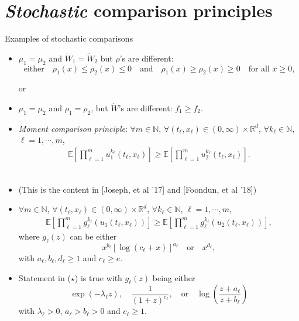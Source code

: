 \documentclass[9pt,table,xcolor=dvipsnames]{beamer}%
\newcommand{\E}{\mathbb{E}}
\newcommand{\W}{\dot{W}}
\newcommand{\bbN}{\mathbb{N}}
\newcommand{\R}{\mathbb{R}}
\theoremstyle{definition}
\theoremstyle{plain}
\begin{document}
\section{\hspace{1em} {\it Stochastic}  comparison principles}
\begin{frame}{Examples of stochastic comparisons}
\begin{itemize}
  \item[Assume~]  $\mu_1=\mu_2$ and $\dot{W}_1=\W_2$ but $\rho$'s are different:
    \[
      \text{either}\quad
      \rho_1(x)\le \rho_2(x)\le 0
      \quad\text{and}\quad \rho_1(x)\ge \rho_2(x)\ge 0\quad \text{for all $x\ge 0$,}
    \]
  \begin{center}
   or
  \end{center}
  \vspace{0.3em}
  \item[Assume~] $\mu_1=\mu_2$ and $\rho_1=\rho_2$, but $\W$'s are different: $f_1\ge f_2$.
    \vfill
    \item[Eg. 1~] \textcolor{yellow!75!black}{\it Moment comparison principle}:
    $\forall m\in\bbN$, $\forall (t_\ell,x_\ell)\in (0,\infty)\times\R^d$, $\forall k_\ell\in\bbN$, $\ell=1,\cdots,m$,
     \begin{align*}
     \E\left[\prod_{\ell=1}^m u_1^{k_\ell}(t_\ell,x_\ell)\right]
     \ge
     \E\left[\prod_{\ell=1}^m u_2^{k_\ell}(t_\ell,x_\ell)\right].
    \end{align*}
    \\[1.5em]
  \item[] (This is the content in {\small [Joseph, et al '17] and [Foondun, et al '18]})
\end{itemize}
\end{frame}
\begin{frame}
\begin{itemize}
  \item[Eg. 2~]
    $\forall m\in\bbN$, $\forall (t_\ell,x_\ell)\in (0,\infty)\times\R^d$, $\forall k_\ell\in\bbN$, $\ell=1,\cdots,m$,
    \begin{align}\tag{$\star$}
      \E\left[\prod_{\ell=1}^m g_\ell^{k_\ell}(u_1(t_\ell,x_\ell))\right] \ge
      \E\left[\prod_{\ell=1}^m g_\ell^{k_\ell}(u_2(t_\ell,x_\ell))\right],
    \end{align}
    where $g_\ell(z)$ can be either
    \[
    x^{b_\ell}[\log(c_\ell+ x)]^{a_\ell}
    \quad\text{or} \quad x^{d_\ell},
    \]
    with $a_\ell, b_\ell,d_\ell\ge  1$ and $c_\ell \ge e$.
    \vfill
  \item[Eg. 3~] Statement in ($\star$) is true with $g_\ell(z)$ being either
    \[
      \exp\left(-\lambda_\ell z\right),\quad \frac{1}{(1+z)^{c_\ell}},\quad\text{or}\quad \log\left(\frac{z+a_\ell}{z+b_\ell}\right)
    \]
    with $\lambda_\ell>0$, $a_\ell>b_\ell>0$ and $c_\ell\ge 1$.
\end{itemize}
\end{frame}
\end{document}
